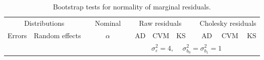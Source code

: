 \begin{table}[ht]
\begin{scriptsize}
\begin{center}
\begin{tabular}{ll p{.1cm} c p{.1cm} rrr p{.1cm} rrr p{.1cm} rrr}
   \hline
\end{tabular}
\end{center}
\end{scriptsize}
\end{table}


\begin{table}[ht]
\caption{\label{tab:bootmarginal}Bootstrap tests for normality of marginal residuals.}
\begin{scriptsize}
\begin{center}
\begin{tabular}{ll p{.1cm} c p{.1cm} rrr p{.1cm} rrr}
  \hline
  \multicolumn{2}{c}{Distributions}& & Nominal & &  \multicolumn{3}{c}{Raw residuals} & & \multicolumn{3}{c}{Cholesky residuals} \\ \cline{1-2} \cline{6-8} \cline{10-12}
  Errors & Random effects & & $\alpha$ & & AD & CVM & KS & & AD & CVM & KS \\ 
   \hline
& && && \multicolumn{6}{c}{$\sigma_{\varepsilon}^2 = 4$, \ \ $\sigma_{b_0}^2 = \sigma_{b_1}^2 = 1$} \\ \cline{6-12}


\end{tabular}
\end{center}
\end{scriptsize}
\end{table}
